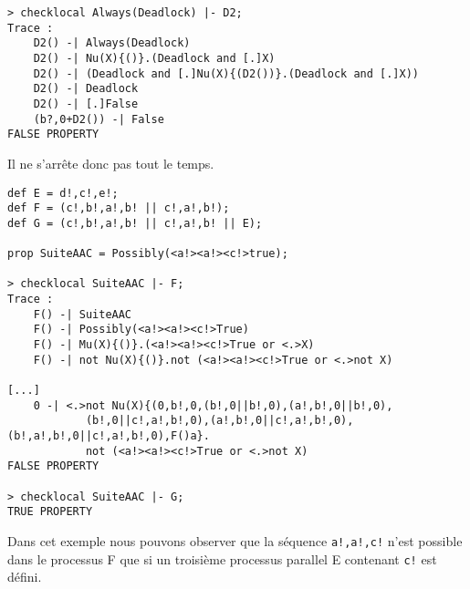 \documentclass[a4paper]{article}
\begin{document}
\begin{verbatim}
> checklocal Always(Deadlock) |- D2;
Trace : 
	D2() -| Always(Deadlock)
	D2() -| Nu(X){()}.(Deadlock and [.]X)
	D2() -| (Deadlock and [.]Nu(X){(D2())}.(Deadlock and [.]X))
	D2() -| Deadlock
	D2() -| [.]False
	(b?,0+D2()) -| False
FALSE PROPERTY

\end{verbatim}

Il ne s'arrête donc pas tout le temps.

\begin{verbatim}
def E = d!,c!,e!;
def F = (c!,b!,a!,b! || c!,a!,b!);
def G = (c!,b!,a!,b! || c!,a!,b! || E);

prop SuiteAAC = Possibly(<a!><a!><c!>true);

> checklocal SuiteAAC |- F;
Trace : 
	F() -| SuiteAAC
	F() -| Possibly(<a!><a!><c!>True)
	F() -| Mu(X){()}.(<a!><a!><c!>True or <.>X)
	F() -| not Nu(X){()}.not (<a!><a!><c!>True or <.>not X)

[...]
	0 -| <.>not Nu(X){(0,b!,0,(b!,0||b!,0),(a!,b!,0||b!,0),
            (b!,0||c!,a!,b!,0),(a!,b!,0||c!,a!,b!,0),(b!,a!,b!,0||c!,a!,b!,0),F()a}.
            not (<a!><a!><c!>True or <.>not X)
FALSE PROPERTY

> checklocal SuiteAAC |- G;
TRUE PROPERTY
\end{verbatim}

Dans cet exemple nous pouvons observer que la
séquence \texttt{a!,a!,c!} n'est possible dans le processus F que si
un troisième processus parallel E contenant
\texttt{c!} est défini.
\end{document}
